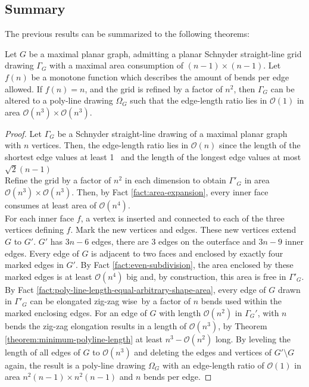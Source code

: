 \subsection{Summary}
The previous results can be summarized to the following theorems:
\begin{theorem}\label{theorem:max-planar-ratio1}
\end{theorem}
Let $G$ be a maximal planar graph, admitting a planar Schnyder straight-line grid drawing $\Gamma_G$ with a maximal area consumption of $(n-1)\times(n-1)$. Let $f(n)$ be a monotone function which describes the amount of bends per edge allowed. If $f(n) = n$, and the grid is refined by a factor of $n^2$, then $\Gamma_G$ can be altered to a poly-line drawing $\Omega_G$ such that the edge-length ratio lies in $\mathcal{O}(1)$ in area $\mathcal{O}(n^3) \times \mathcal{O}(n^3)$.
\begin{proof}
	Let $\Gamma_G$ be a Schnyder straight-line drawing of a maximal planar graph with $n$ vertices. Then, the edge-length ratio lies in $\mathcal{O}(n)$ since the length of the shortest edge values at least 1\UL~ and the length of the longest edge values at most $\sqrt{2}(n-1)$\\
	Refine the grid by a factor of $n^2$ in each dimension to obtain $\Gamma'_G$ in area $\mathcal{O}(n^3)\times \mathcal{O}(n^3)$. Then, by Fact \ref{fact:area-expansion}, every inner face consumes at least area of $\mathcal{O}(n^4)$.\\
	For each inner face $f$, a vertex is inserted and connected to each of the three vertices defining $f$. Mark the new vertices and edges. These new vertices extend $G$ to $G'$. $G'$ has $3n-6$ edges, there are 3 edges on the outerface and $3n-9$ inner edges. Every edge of $G$ is adjacent to two faces and enclosed by exactly four marked edges in $G'$. By Fact \ref{fact:even-subdivision}, the area enclosed by these marked edges is at least $\mathcal{O}(n^4)$ big and, by construction, this area is free in $\Gamma'_G$. By Fact \ref{fact:poly-line-length-equal-arbitrary-shape-area}, every edge of $G$ drawn in $\Gamma'_G$ can be elongated \grqq zig-zag wise\grqq~by a factor of $n$ bends used within the marked enclosing edges. For an edge of $G$ with length $\mathcal{O}(n^2)$ in $\Gamma_G'$, with $n$ bends the zig-zag elongation results in a length of $\mathcal{O}(n^3)$, by Theorem \ref{theorem:minimum-polyline-length} at least $n^3-\mathcal{O}(n^2)$ long. By leveling the length of all edges of $G$ to $\mathcal{O}(n^3)$ and deleting the edges and vertices of $G'\setminus G$ again, the result is a poly-line drawing $\Omega_G$ with an edge-length ratio of $\mathcal{O}(1)$ in area $n^2(n-1)\times n^2(n-1)$ and $n$ bends per edge.
\end{proof}
